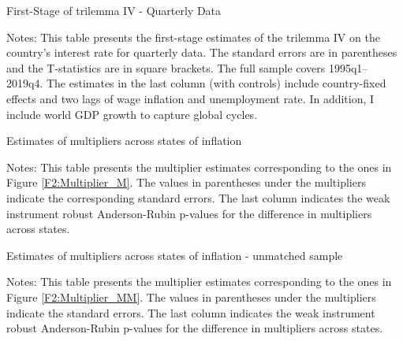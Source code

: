 \documentclass[12pt]{article}
\newcommand{\annote}[1]{\parbox{\textwidth}{\renewcommand{\baselinestretch}{1.0}\vspace{12pt} \footnotesize Notes: #1}}
\begin{document}
\begin{appendices}
\begin{table}[ht]
\centering
\caption{First-Stage of trilemma IV - Quarterly Data} \label{T:First_Stage_Quarter}
\vspace{1ex}
\def\sym#1{\ifmmode^{#1}\else\(^{#1}\)\fi}

\annote{This table presents the first-stage estimates of the trilemma IV on the country's interest rate for quarterly data. The standard errors are in parentheses and the T-statistics are in square brackets. The full sample covers 1995q1–2019q4. The estimates in the last column (with controls) include country-fixed effects and two lags of wage inflation and unemployment rate. In addition, I include world GDP growth to capture global cycles.}
\end{table}

\begin{singlespace}
\begin{table}[ht]
\footnotesize
\centering
\def\sym#1{\ifmmode^{#1}\else\(^{#1}\)\fi}
\caption{Estimates of multipliers across states of inflation \label{T:SDPM}}

\annote{\footnotesize This table presents the multiplier estimates corresponding to the ones in Figure \ref{F2:Multiplier_M}. The values in parentheses under the multipliers indicate the corresponding standard errors. The last column indicates the weak instrument robust Anderson-Rubin p-values for the difference in multipliers across states.}
\end{table}

\begin{table}[ht]
\footnotesize
\centering
\def\sym#1{\ifmmode^{#1}\else\(^{#1}\)\fi}
\caption{Estimates of multipliers across states of inflation - unmatched sample \label{T:SDPM_App}}

\annote{\footnotesize This table presents the multiplier estimates corresponding to the ones in Figure \ref{F2:Multiplier_MM}. The values in parentheses under the multipliers indicate the standard errors. The last column indicates the weak instrument robust Anderson-Rubin p-values for the difference in multipliers across states.}
\end{table}


\end{singlespace}
\end{appendices}
\end{document}
